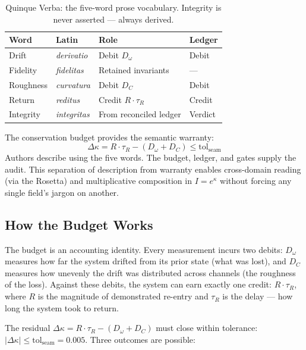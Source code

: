 \documentclass[
  aps,
  prd,
  twocolumn,
  superscriptaddress,
  nofootinbib,
  floatfix
]{revtex4-2}
\newcommand{\tR}{\tau_{\!R}}
\newcommand{\tolseam}{\mathrm{tol}_{\mathrm{seam}}}
\newcommand{\beq}{\begin{equation}}
\newcommand{\eeq}{\end{equation}}
\newcommand{\Drft}{\omega}
\newcommand{\Curv}{C}
\newcommand{\Logint}{\kappa}
\newcommand{\lat}[1]{\textit{#1}}
\begin{document}
\begin{table}[htbp]
\centering
\small
\caption{Quinque Verba: the five-word prose vocabulary.
  Integrity is never asserted --- always derived.}
\label{tab:quinque}
\begin{tabular}{@{}llP{1.6cm}l@{}}
\toprule
\textbf{Word} & \textbf{Latin} & \textbf{Role} &
  \textbf{Ledger} \\
\midrule
Drift     & \lat{derivatio} & Debit $D_\Drft$ &  Debit \\
Fidelity  & \lat{fidelitas} & Retained invariants & --- \\
Roughness & \lat{curvatura} & Debit $D_\Curv$ & Debit \\
Return    & \lat{reditus}   & Credit $R{\cdot}\tR$ & Credit \\
Integrity & \lat{integritas}& From reconciled ledger & Verdict \\
\bottomrule
\end{tabular}
\end{table}

\noindent
The conservation budget provides the semantic warranty:
\beq
  \Delta\Logint = R \cdot \tR - (D_\Drft + D_\Curv) \leq \tolseam
  \label{eq:budget}
\eeq
Authors describe using the five words. The budget, ledger, and
gates supply the audit. This separation of description from
warranty enables cross-domain reading (via the Rosetta) and
multiplicative composition in $I = e^\Logint$ without forcing
any single field's jargon on another.

\subsection{How the Budget Works}\label{sec:budget-mech}

The budget is an accounting identity. Every measurement incurs
two debits: $D_\Drft$ measures how far the system drifted from
its prior state (what was lost), and $D_\Curv$ measures how
unevenly the drift was distributed across channels (the
roughness of the loss). Against these debits, the system can
earn exactly one credit: $R \cdot \tR$, where $R$ is the
magnitude of demonstrated re-entry and $\tR$ is the delay ---
how long the system took to return.

The residual $\Delta\Logint = R \cdot \tR - (D_\Drft + D_\Curv)$
must close within tolerance:
$|\Delta\Logint| \leq \tolseam = 0.005$. Three outcomes are
possible:
\end{document}
